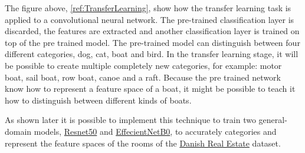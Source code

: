 The figure above, \autoref{ref:TransferLearning}, show how the transfer learning task is applied to a convolutional neural network. The pre-trained classification layer is discarded, the features are extracted and another classification layer is trained on top of the pre trained model. The pre-trained model can distinguish between four different categories, dog, cat, boat and bird. In the transfer learning stage, it will be possible to create multiple completely new categories, for example: motor boat, sail boat, row boat, canoe and a raft. Because the pre trained network know how to represent a feature space of a boat, it might be possible to teach it how to distinguish between different kinds of boats.\par
As shown later it is possible to implement this technique to train two general-domain models, \hyperref[sec:resnet50]{Resnet50} and \hyperref[sec:effecientnet]{EffecientNetB0}, to accurately categories and represent the feature spaces of the rooms of the \hyperref[sec:DRE19]{Danish Real Estate} dataset.
